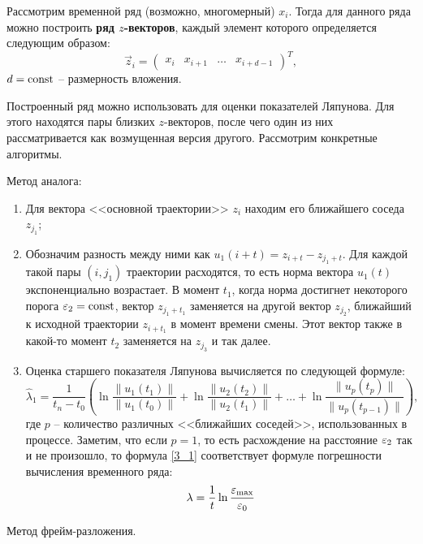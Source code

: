 
Рассмотрим временной ряд (возможно, многомерный) $x_i$. Тогда для данного ряда можно построить \textbf{ряд $z$-векторов}, каждый элемент которого определяется следующим образом:
\begin{equation*}
    \vec z_i = \begin{pmatrix}
        x_i & x_{i+1} & \dots & x_{i+d-1}
    \end{pmatrix}^T,
\end{equation*}
$d = \mathrm{const}$ -- размерность вложения.

Построенный ряд можно использовать для оценки показателей Ляпунова. Для этого находятся пары близких $z$-векторов, после чего один из них рассматривается как возмущенная версия другого. Рассмотрим конкретные алгоритмы.

Метод аналога:
\begin{enumerate}
\item
    Для вектора <<основной траектории>> $z_i$ находим его ближайшего соседа $z_{j_1}$;
\item
    Обозначим разность между ними как $u_1(i+t) = z_{i+t} - z_{j_1+t}$.
    Для каждой такой пары $(i, j_1)$ траектории расходятся, то есть норма вектора $u_1(t)$ экспоненциально возрастает.
    В момент $t_1$, когда норма достигнет некоторого порога $\varepsilon_2 = \mathrm{const}$, вектор $z_{j_1+t_1}$ заменяется на другой вектор $z_{j_2}$, ближайший к исходной траектории $z_{i+t_1}$ в момент времени смены.
    Этот вектор также в какой-то момент $t_2$ заменяется на $z_{j_3}$ и так далее.
\item
    Оценка старшего показателя Ляпунова вычисляется по следующей формуле:
    \begin{equation}
    \label{3_1}
        \hat{\lambda}_1 = 
        \frac{1}{t_n - t_0} \left(
            \ln \frac{\|u_1(t_1)\|}{\|u_1(t_0)\|} +
            \ln \frac{\|u_2(t_2)\|}{\|u_2(t_1)\|} +
            \dots +
            \ln \frac{\|u_p(t_p)\|}{\|u_p(t_{p-1})\|}
        \right),
    \end{equation}
    где $p$ -- количество различных <<ближайших соседей>>, использованных в процессе.
    Заметим, что если $p=1$, то есть расхождение на расстояние $\varepsilon_2$ так и не произошло, то формула \eqref{3_1} соответствует формуле погрешности вычисления временного ряда:
    \begin{equation*}
        \lambda = \frac{1}{t} \ln \frac{\varepsilon_{\text{max}}}{\varepsilon_0}
    \end{equation*}
\end{enumerate}


Метод фрейм-разложения.

